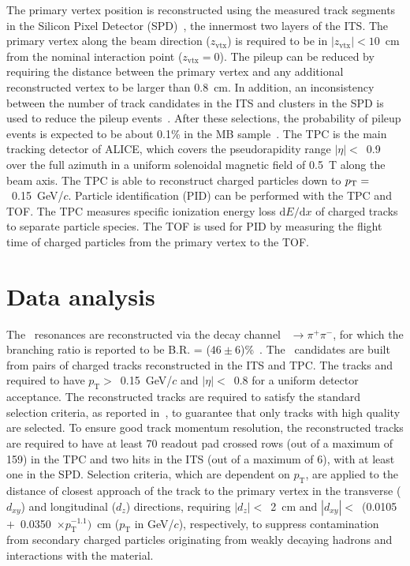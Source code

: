 The primary vertex position is reconstructed using the measured track segments in the Silicon Pixel Detector (SPD)~\cite{Santoro2009:ALICESPD}, the innermost two layers of the ITS. The primary vertex along the beam direction ($z_\mathrm{vtx}$) is required to be in $|z_\mathrm{vtx}|<10$~cm from the nominal interaction point ($z_\mathrm{vtx}=0$). The pileup can be reduced by requiring the distance between the primary vertex and any additional reconstructed vertex to be larger than 0.8~cm. In addition, an inconsistency between the number of track candidates in the ITS and clusters in the SPD is used to reduce the pileup events~\cite{ALICE:2015olq}. After these selections, the probability of pileup events is expected to be about 0.1\% in the MB sample~\cite{ALICE:2017svf}. The TPC is the main tracking detector of ALICE, which covers the pseudorapidity range $|\eta|<$~0.9 over the full azimuth in a uniform solenoidal magnetic field of 0.5~T along the beam axis. The TPC is able to reconstruct charged particles down to $p_{\rm{T}}=$~0.15~GeV/$c$. Particle identification (PID) can be performed with the TPC and TOF. The TPC measures specific ionization energy loss $\mathrm{d}E/\mathrm{d}x$ of charged tracks to separate particle species. The TOF is used for PID by measuring the flight time of charged particles from the primary vertex to the TOF.

\section{Data analysis}

The \fzero~resonances are reconstructed via the decay channel \fzero~$\rightarrow \pi^{+}\pi^{-}$, for which the branching ratio is reported to be B.R. = ($46\pm6$)\%~\cite{Stone:2013eaa}. The \fzero~candidates are built from pairs of charged tracks reconstructed in the ITS and TPC. The tracks and required to have $p_{\mathrm{T}}>$~0.15~GeV/$c$ and $|\eta|<$~0.8 for a uniform detector acceptance. The reconstructed tracks are required to satisfy the standard selection criteria, as reported in~\cite{ALICE:2022qnb}, to guarantee that only tracks with high quality are selected. To ensure good track momentum resolution, the reconstructed tracks are required to have at least 70 readout pad crossed rows (out of a maximum of 159) in the TPC and two hits in the ITS (out of a maximum of 6), with at least one in the SPD. Selection criteria, which are dependent on $p_{\mathrm{T}}$, are applied to the distance of closest approach of the track to the primary vertex in the transverse ($d_{xy}$) and longitudinal ($d_{z}$) directions, requiring $|d_{z}|<$~2~cm and $|d_{xy}|<$~(0.0105~$+$~0.0350~$\times p_{\mathrm{T}}^{-1.1})$~cm ($p_{\mathrm{T}}$ in GeV/$c$), respectively, to suppress contamination from secondary charged particles originating from weakly decaying hadrons and interactions with the material.

